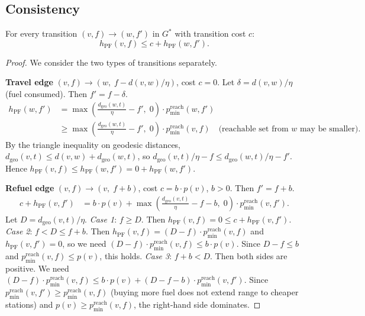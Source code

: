 \subsection{Consistency}

\begin{theorem}
    For every transition $(v,f) \to (w,f')$ in $G^{*}$ with transition cost $c$:
    \[
        h_{\mathrm{PF}}(v,f) \leq c + h_{\mathrm{PF}}(w,f').
    \]
\end{theorem}
\begin{proof}
    We consider the two types of transitions separately.

    \textbf{Travel edge} $(v,f) \to (w,\; f - d(v,w)/\eta)$, cost $c = 0$.
    Let $\delta = d(v,w)/\eta$ (fuel consumed).
    Then $f' = f - \delta$.
    \begin{align*}
        h_{\mathrm{PF}}(w, f')
        &= \max\!\left(\frac{d_{\mathrm{geo}}(w,t)}{\eta} - f',\; 0\right)
           \cdot p_{\min}^{\mathrm{reach}}(w, f') \\
        &\geq \max\!\left(\frac{d_{\mathrm{geo}}(w,t)}{\eta} - f',\; 0\right)
           \cdot p_{\min}^{\mathrm{reach}}(v, f)
           \quad\text{(reachable set from $w$ may be smaller)}.
    \end{align*}
    By the triangle inequality on geodesic distances,
    $d_{\mathrm{geo}}(v,t) \leq d(v,w) + d_{\mathrm{geo}}(w,t)$, so
    $d_{\mathrm{geo}}(v,t)/\eta - f \leq d_{\mathrm{geo}}(w,t)/\eta - f'$.
    Hence $h_{\mathrm{PF}}(v,f) \leq h_{\mathrm{PF}}(w,f') = 0 + h_{\mathrm{PF}}(w,f')$.

    \textbf{Refuel edge} $(v,f) \to (v,\; f+b)$, cost $c = b \cdot p(v)$, $b > 0$.
    Then $f' = f + b$.
    \begin{align*}
        c + h_{\mathrm{PF}}(v,f')
        &= b \cdot p(v) + \max\!\left(\frac{d_{\mathrm{geo}}(v,t)}{\eta} - f - b,\; 0\right)
           \cdot p_{\min}^{\mathrm{reach}}(v, f').
    \end{align*}
    Let $D = d_{\mathrm{geo}}(v,t)/\eta$.
    \textit{Case 1}: $f \geq D$.
    Then $h_{\mathrm{PF}}(v,f) = 0 \leq c + h_{\mathrm{PF}}(v,f')$.
    \textit{Case 2}: $f < D \leq f + b$.
    Then $h_{\mathrm{PF}}(v,f) = (D-f)\cdot p_{\min}^{\mathrm{reach}}(v,f)$ and
    $h_{\mathrm{PF}}(v,f') = 0$, so we need $(D-f)\cdot p_{\min}^{\mathrm{reach}}(v,f) \leq b \cdot p(v)$.
    Since $D - f \leq b$ and $p_{\min}^{\mathrm{reach}}(v,f) \leq p(v)$,
    this holds.
    \textit{Case 3}: $f + b < D$.
    Then both sides are positive.
    We need $(D-f)\cdot p_{\min}^{\mathrm{reach}}(v,f) \leq b\cdot p(v) + (D-f-b)\cdot p_{\min}^{\mathrm{reach}}(v,f')$.
    Since $p_{\min}^{\mathrm{reach}}(v,f') \geq p_{\min}^{\mathrm{reach}}(v,f)$ (buying more
    fuel does not extend range to cheaper stations) and $p(v) \geq p_{\min}^{\mathrm{reach}}(v,f)$,
    the right-hand side dominates.
\end{proof}

